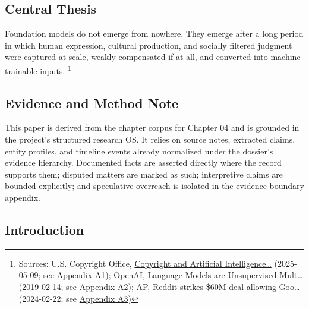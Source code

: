 \documentclass[
  american,
  11pt,
  letterpaper,
]{article}
\begin{document}
\subsection{Central Thesis}\label{central-thesis}

Foundation models do not emerge from nowhere. They emerge after a long
period in which human expression, cultural production, and socially
filtered judgment were captured at scale, weakly compensated if at all,
and converted into machine-trainable inputs. \footnote{Sources: U.S.
  Copyright Office,
  \href{https://copyright.gov/ai/Copyright-and-Artificial-Intelligence-Part-3-Generative-AI-Training-Report-Pre-Publication-Version.pdf}{Copyright
  and Artificial Intelligence\ldots{}} (2025-05-09; see
  \hyperref[appendix-a1-copyright-and-artificial-intelligence-part-3-generative-ai-training-pre-publication-version]{Appendix
  A1}); OpenAI,
  \href{https://cdn.openai.com/better-language-models/language_models_are_unsupervised_multitask_learners.pdf}{Language
  Models are Unsupervised Mult\ldots{}} (2019-02-14; see
  \hyperref[appendix-a2-language-models-are-unsupervised-multitask-learners]{Appendix
  A2}); AP,
  \href{https://apnews.com/article/a7f131c7cb4225307134ef21d3c6a708}{Reddit
  strikes \$60M deal allowing Goo\ldots{}} (2024-02-22; see
  \hyperref[appendix-a3-reddit-strikes-60m-deal-allowing-google-to-train-ai-models-on-its-posts-unveils-ipo-plans]{Appendix
  A3})}

\subsection{Evidence and Method Note}\label{evidence-and-method-note}

This paper is derived from the chapter corpus for Chapter 04 and is
grounded in the project's structured research OS. It relies on source
notes, extracted claims, entity profiles, and timeline events already
normalized under the dossier's evidence hierarchy. Documented facts are
asserted directly where the record supports them; disputed matters are
marked as such; interpretive claims are bounded explicitly; and
speculative overreach is isolated in the evidence-boundary appendix.

\subsection{Introduction}\label{introduction}
\end{document}

